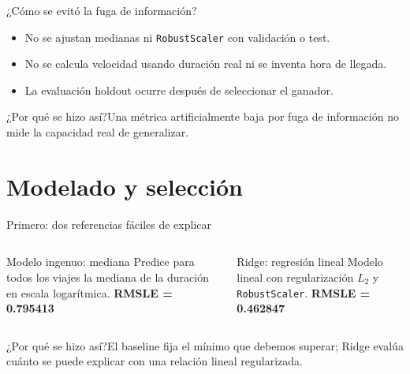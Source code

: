\documentclass[aspectratio=169,11pt]{beamer}
\newcommand{\porq}[1]{\vspace{1.2mm}\begin{block}{¿Por qué se hizo así?}\small #1\end{block}}
\begin{document}
\begin{frame}{¿Cómo se evitó la fuga de información?}
\centering
{}
\vspace{8mm}
\begin{itemize}
\item No se ajustan medianas ni \texttt{RobustScaler} con validación o test.
\item No se calcula velocidad usando duración real ni se inventa hora de llegada.
\item La evaluación holdout ocurre después de seleccionar el ganador.
\end{itemize}
\porq{Una métrica artificialmente baja por fuga de información no mide la capacidad real de generalizar.}
\end{frame}

\section{Modelado y selección}
\begin{frame}{Primero: dos referencias fáciles de explicar}
\begin{columns}[T]
\begin{block}{Modelo ingenuo: mediana}
Predice para todos los viajes la mediana de la duración en escala logarítmica.
\vspace{2mm}
\centering\Large\textbf{RMSLE = 0.795413}
\end{block}
\begin{block}{Ridge: regresión lineal}
Modelo lineal con regularización $L_2$ y \texttt{RobustScaler}.
\vspace{2mm}
\centering\Large\textbf{RMSLE = 0.462847}
\end{block}
\end{columns}
\porq{El baseline fija el mínimo que debemos superar; Ridge evalúa cuánto se puede explicar con una relación lineal regularizada.}
\end{frame}
\end{document}
